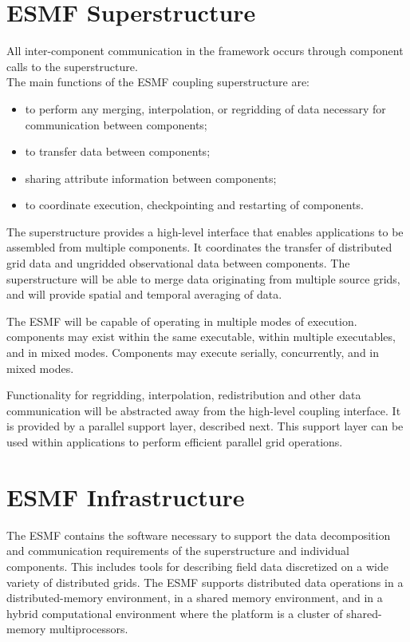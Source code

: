 \section{ESMF Superstructure}

All inter-component communication in the framework occurs through 
component calls to the superstructure. \\

\noindent The main functions of the ESMF coupling superstructure are:

\begin{itemize}
\item to perform any merging, interpolation, or regridding 
of data necessary for communication between components;
\item to transfer data between components;
\item sharing attribute information between components;
\item to coordinate execution, checkpointing and restarting of
  components.
\end{itemize}

The superstructure provides a high-level interface that enables 
applications to be assembled from multiple components.  It coordinates
the transfer of distributed grid data and ungridded 
observational data between components.  The superstructure will be able 
to merge data originating from multiple source grids, and will 
provide spatial and temporal averaging of data.

The ESMF will be capable of operating in multiple modes of execution.
components may exist within the same executable, within multiple 
executables, and in mixed modes.  Components may execute serially, 
concurrently, and in mixed modes.  

Functionality for regridding, interpolation, redistribution and other 
data communication will be abstracted away from the high-level coupling
interface.  It is provided by a parallel support layer, described next.  
This support layer can be used within applications 
to perform efficient parallel grid operations.

\section{ESMF Infrastructure}

The ESMF contains the software necessary to support the data
decomposition and communication requirements of the superstructure and
individual components.  This includes tools for describing field
data discretized on a wide variety of distributed grids.  The ESMF
supports distributed data operations in a distributed-memory environment, 
in a shared memory environment, and in a hybrid computational environment 
where the platform is a cluster of shared-memory multiprocessors.

